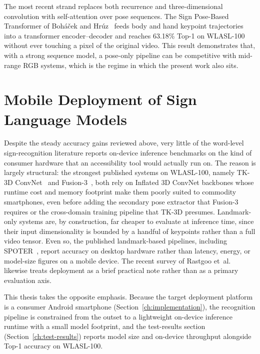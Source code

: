 The most recent strand replaces both recurrence and three-dimensional
convolution with self-attention over pose sequences. The Sign
Pose-Based Transformer of Boh\'a\v{c}ek and
Hr\'uz~\cite{bohacek2022spoter} feeds body and hand keypoint
trajectories into a transformer encoder--decoder and reaches 63.18\%
Top-1 on WLASL-100 without ever touching a pixel of the original
video. This result demonstrates that, with a strong sequence model, a
pose-only pipeline can be competitive with mid-range RGB systems,
which is the regime in which the present work also sits.

\section{Mobile Deployment of Sign Language Models}
\label{sec:related-mobile}

Despite the steady accuracy gains reviewed above, very little of the
word-level sign-recognition literature reports on-device inference
benchmarks on the kind of consumer hardware that an accessibility tool
would actually run on. The reason is largely structural: the strongest
published systems on WLASL-100, namely TK-3D
ConvNet~\cite{li2020transferring} and
Fusion-3~\cite{hosain2021fusion}, both rely on Inflated 3D ConvNet
backbones whose runtime cost and memory footprint make them poorly
suited to commodity smartphones, even before adding the secondary pose
extractor that Fusion-3 requires or the cross-domain training pipeline
that TK-3D presumes. Landmark-only systems are, by construction, far
cheaper to evaluate at inference time, since their input
dimensionality is bounded by a handful of keypoints rather than a full
video tensor. Even so, the published landmark-based pipelines,
including SPOTER~\cite{bohacek2022spoter}, report accuracy on desktop
hardware rather than latency, energy, or model-size figures on a
mobile device. The recent survey of Rastgoo
et~al.~\cite{rastgoo2021slr} likewise treats deployment as a brief
practical note rather than as a primary evaluation axis.

This thesis takes the opposite emphasis. Because the target deployment
platform is a consumer Android smartphone
(Section~\ref{ch:implementation}), the recognition pipeline is
constrained from the outset to a lightweight on-device inference
runtime with a small model footprint, and the test-results section
(Section~\ref{ch:test-results}) reports model size and on-device
throughput alongside Top-1 accuracy on WLASL-100.


